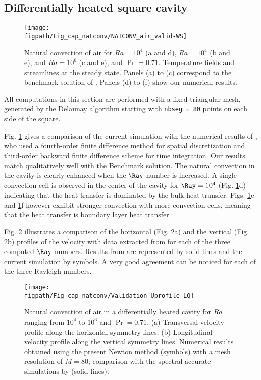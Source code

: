 \subsection{Differentially heated square cavity} \label{sub-diff-heated}

\begin{figure}[!h]
	\begin{center}
		\texttt{[image: \\figpath/Fig\_cap\_natconv/NATCONV\_air\_valid-WS]} 
	\end{center}
	\caption{Natural convection of air for $Ra = 10^4$ (a and d), $Ra = 10^4$ (b and e), and $Ra = 10^6$ (c and e), and $\Pr = 0.71$. Temperature fields and streamlines at the steady state. Panels (a) to (c) correspond to the benchmark solution of \cite{Wakashima-2004}. Panels (d) to (f) show our numerical results.}
	\label{fig-natconv-field}
\end{figure}

All computations in this section are performed with a fixed triangular mesh, generated by the Delaunay algorithm starting with \texttt{nbseg = 80} points on each side of the square.

Fig. \ref{fig-natconv-field} gives a comparison of the current simulation with the numerical results of \cite{Wakashima-2004}, who
used a fourth-order finite difference method for spatial discretization and third-order backward finite difference scheme for time integration.
Our results match qualitatively well with the Benchmark solution.
The natural convection in the cavity is clearly enhanced when the $\Ray$ number is increased.
A single convection cell is observed in the center of the cavity for $\Ray = 10^4$ (Fig. \ref{fig-natconv-field}d) indicating that the heat transfer is dominated by the bulk heat transfer.
Figs. \ref{fig-natconv-field}e and \ref{fig-natconv-field}f however exhibit stronger convection with more convection cells, meaning that the heat transfer is boundary layer heat transfer

Fig. \ref{fig-T1-prof} illustrates a comparison of the horizontal (Fig. \ref{fig-T1-prof}a) and the vertical (Fig. \ref{fig-T1-prof}b)  profiles of the velocity with data extracted from  \cite{LeQuere91} for each of the three computed $\Ray$ numbers.
Results from \cite{LeQuere91} are represented by solid lines and the current simulation by symbols.
A very good agreement can  be noticed for each of the three Rayleigh numbers.

\begin{figure}
	\begin{center}
		\texttt{[image: \\figpath/Fig\_cap\_natconv/Validation\_Uprofile\_LQ]} 
	\end{center}
	\caption{Natural convection of air in a differentially heated cavity for $Ra$ ranging from $10^4$ to $10^6$ and $\Pr = 0.71$. (a) Transversal velocity profile along the  horizontal symmetry lines. (b) Longitudinal velocity profile along the vertical symmetry lines. Numerical results obtained using the present Newton method (symbols) with a mesh resolution of $M=80$; comparison with the spectral-accurate simulations by \cite{LeQuere91} (solid lines).}
	\label{fig-T1-prof}
\end{figure}

